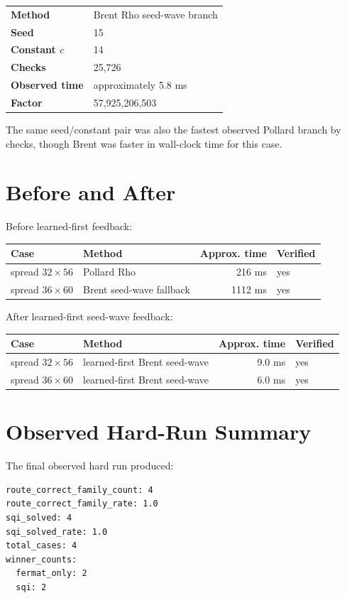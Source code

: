 \documentclass[11pt,a4paper]{article}
\begin{document}
\begin{tabularx}{\textwidth}{@{}lX@{}}
\textbf{Method} & Brent Rho seed-wave branch \\
\textbf{Seed} & 15 \\
\textbf{Constant \(c\)} & 14 \\
\textbf{Checks} & 25,726 \\
\textbf{Observed time} & approximately 5.8 ms \\
\textbf{Factor} & 57,925,206,503 \\
\end{tabularx}

The same seed/constant pair was also the fastest observed Pollard branch by checks, though
Brent was faster in wall-clock time for this case.

\section{Before and After}

Before learned-first feedback:

\begin{tabularx}{\textwidth}{@{}l l r l@{}}
\textbf{Case} & \textbf{Method} & \textbf{Approx. time} & \textbf{Verified} \\
\hline
spread \(32 \times 56\) & Pollard Rho & 216 ms & yes \\
spread \(36 \times 60\) & Brent seed-wave fallback & 1112 ms & yes \\
\end{tabularx}

After learned-first seed-wave feedback:

\begin{tabularx}{\textwidth}{@{}l l r l@{}}
\textbf{Case} & \textbf{Method} & \textbf{Approx. time} & \textbf{Verified} \\
\hline
spread \(32 \times 56\) & learned-first Brent seed-wave & 9.0 ms & yes \\
spread \(36 \times 60\) & learned-first Brent seed-wave & 6.0 ms & yes \\
\end{tabularx}

\section{Observed Hard-Run Summary}

The final observed hard run produced:

\begin{verbatim}
route_correct_family_count: 4
route_correct_family_rate: 1.0
sqi_solved: 4
sqi_solved_rate: 1.0
total_cases: 4
winner_counts:
  fermat_only: 2
  sqi: 2
\end{verbatim}
\end{document}

